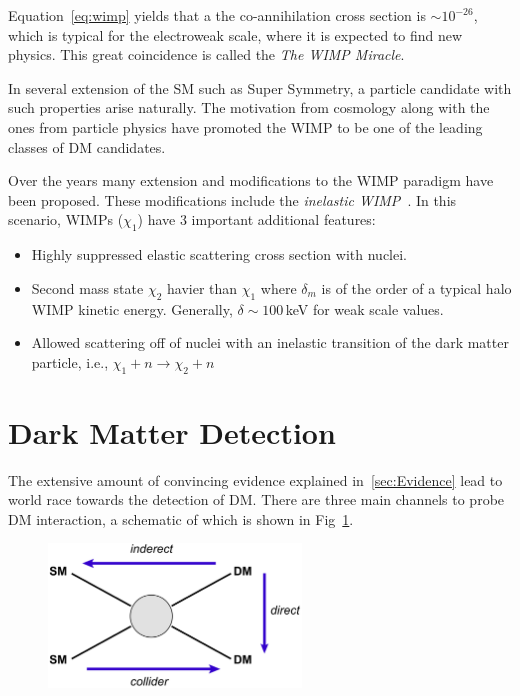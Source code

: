 Equation~\ref{eq:wimp} yields that a the co-annihilation cross section is $\sim 10^{-26}$, which is typical for the electroweak scale, where it is expected to find new physics. This great coincidence is called the \textit{The WIMP Miracle}.

In several extension of the SM such as Super Symmetry, a particle candidate with such properties arise naturally. The motivation from cosmology along with the ones from particle physics have promoted the WIMP to be one of the leading classes of DM candidates. 

Over the years many extension and modifications to the WIMP paradigm have been proposed. These modifications include the \textit{inelastic WIMP}~\cite{InelasticIntro}. In this scenario, WIMPs ($\chi_1$) have 3 important additional features:
\begin{itemize}
\item Highly suppressed elastic scattering cross section with nuclei.
\item Second mass state $\chi_2$ havier than $\chi_1$ where $\delta_m$ is of the order of a typical halo WIMP kinetic energy. Generally, $\delta \sim 100$\,keV for weak scale values. 
\item Allowed scattering off of nuclei with an inelastic transition of the dark matter particle, i.e., $\chi_1 + n \rightarrow \chi_2 + n$
\end{itemize}




\section{Dark Matter Detection}
\label{sec:DMDet}

The extensive amount of convincing evidence explained in~\ref{sec:Evidence} lead to world race towards the detection of DM. There are three main channels to probe DM interaction, a schematic of which is shown in Fig~\ref{fig:detectionScheme}.

\begin{figure}[]
	\centering
	\includegraphics[width=0.6\textwidth]{figs/detection_channels.png}
	\label{fig:detectionScheme}
\end{figure}  

